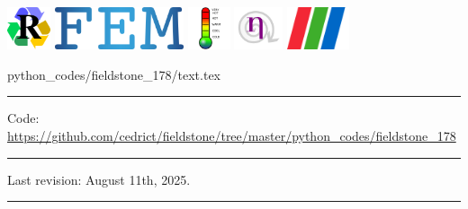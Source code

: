 \noindent
\includegraphics[height=1.25cm]{images/pictograms/replication}
\includegraphics[height=1.25cm]{images/pictograms/FEM}
\includegraphics[height=1.25cm]{images/pictograms/temperature}
\includegraphics[height=1.25cm]{images/pictograms/nonlinear}
\includegraphics[height=1.25cm]{images/pictograms/paraview}


\begin{flushright} {\tiny {\color{gray} python\_codes/fieldstone\_178/text.tex}} \end{flushright}

%

\par\noindent\rule{\textwidth}{0.4pt}

\begin{center}
\inpython
{\small Code: \url{https://github.com/cedrict/fieldstone/tree/master/python_codes/fieldstone_178}}
\end{center}

\par\noindent\rule{\textwidth}{0.4pt}

Last revision: August 11th, 2025.

\par\noindent\rule{\textwidth}{0.4pt}


